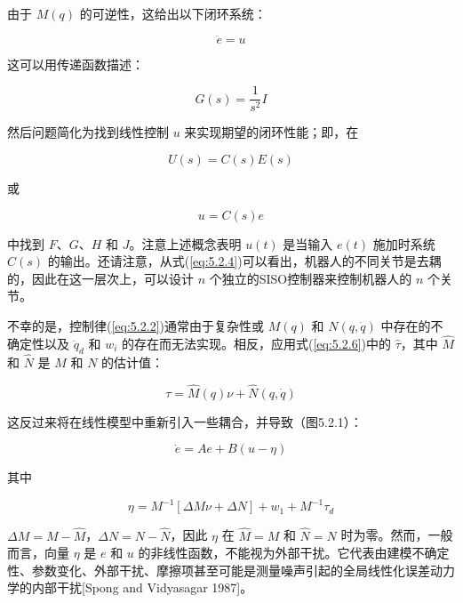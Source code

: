 \documentclass[UTF8,12pt,a4paper]{ctexart}
\begin{document}
由于 $M(q)$ 的可逆性，这给出以下闭环系统：

\begin{equation}\label{eq:5.2.3}
\ddot{e} = u
\end{equation}

这可以用传递函数描述：

\begin{equation}\label{eq:5.2.4}
G(s) = \frac{1}{s^2}I
\end{equation}

然后问题简化为找到线性控制 $u$ 来实现期望的闭环性能；即，在

\begin{equation}
U(s) = C(s)E(s)
\end{equation}

或

\begin{equation}\label{eq:5.2.5}
u = C(s)e
\end{equation}

中找到 $F$、$G$、$H$ 和 $J$。注意上述概念表明 $u(t)$ 是当输入 $e(t)$ 施加时系统 $C(s)$ 的输出。还请注意，从式(\ref{eq:5.2.4})可以看出，机器人的不同关节是去耦的，因此在这一层次上，可以设计 $n$ 个独立的SISO控制器来控制机器人的 $n$ 个关节。

不幸的是，控制律(\ref{eq:5.2.2})通常由于复杂性或 $M(q)$ 和 $N(q, \dot{q})$ 中存在的不确定性以及 $\ddot{q}_d$ 和 $w_i$ 的存在而无法实现。相反，应用式(\ref{eq:5.2.6})中的 $\hat{\tau}$，其中 $\hat{M}$ 和 $\hat{N}$ 是 $M$ 和 $N$ 的估计值：

\begin{equation}\label{eq:5.2.6}
\tau = \hat{M}(q)\nu + \hat{N}(q, \dot{q})
\end{equation}

这反过来将在线性模型中重新引入一些耦合，并导致（图5.2.1）：

\begin{equation}\label{eq:5.2.7}
\dot{e} = Ae + B(u - \eta)
\end{equation}

其中

\begin{equation}
\eta = M^{-1}[\Delta M \nu + \Delta N] + w_1 + M^{-1}\tau_d
\end{equation}

$\Delta M = M - \hat{M}$，$\Delta N = N - \hat{N}$，因此 $\eta$ 在 $\hat{M} = M$ 和 $\hat{N} = N$ 时为零。然而，一般而言，向量 $\eta$ 是 $e$ 和 $u$ 的非线性函数，不能视为外部干扰。它代表由建模不确定性、参数变化、外部干扰、摩擦项甚至可能是测量噪声引起的全局线性化误差动力学的内部干扰[Spong and Vidyasagar 1987]。
\end{document}
